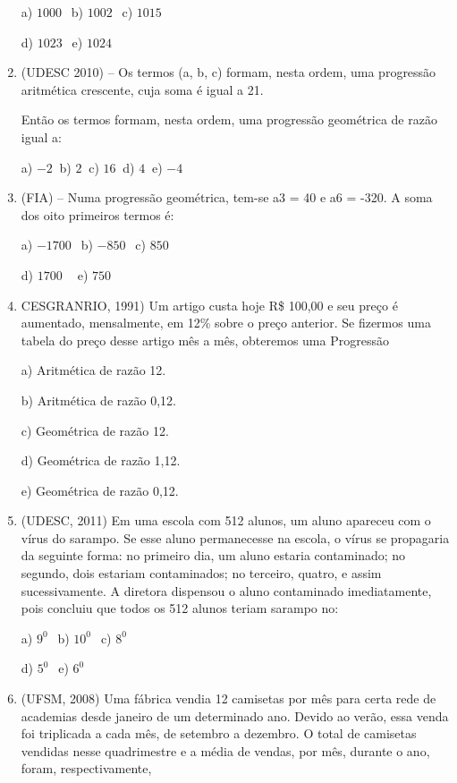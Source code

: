 \begin{multicols*}{2}
\begin{enumerate}
	a) $1000 \ \ $ b) $1002 \ \ $ c) $1015 \ \ $ 
	
	d) $1023 \ \ $ e) $1024 $
	
\item (UDESC 2010) – Os termos (a, b, c) formam, nesta ordem, uma progressão aritmética crescente, cuja soma é igual a 21.

Então os termos formam, nesta ordem, uma progressão geométrica de razão igual a:

	a) $-2 \ $ b) $2 \ $ c) $16 \ $ d) $4 \ $ e) $-4$
	
\item (FIA) – Numa progressão geométrica, tem-se a3 = 40 e a6 = -320. A soma dos oito primeiros termos é:

	a) $-1700 \ \ $ b) $-850 \ \ $ c) $850 \ \ $ 
	
	d) $1700 \ \ \ \ $ e) $750 $

\item CESGRANRIO, 1991) Um artigo custa hoje R\$ 100,00 e seu preço é aumentado, mensalmente, em 12\% sobre o preço anterior. Se fizermos uma tabela do preço desse artigo mês a mês, obteremos uma Progressão

a) Aritmética de razão 12.

b) Aritmética de razão 0,12.

c) Geométrica de razão 12.

d) Geométrica de razão 1,12.

e) Geométrica de razão 0,12.

\item (UDESC, 2011) Em uma escola com 512 alunos, um aluno apareceu com o vírus do sarampo. Se esse aluno permanecesse na escola, o vírus se propagaria da seguinte forma: no primeiro dia, um aluno estaria contaminado; no segundo, dois estariam contaminados; no terceiro, quatro, e assim sucessivamente. A diretora dispensou o aluno contaminado imediatamente, pois concluiu que todos os 512 alunos teriam sarampo no:

	a) $9^0 \ \ $ b) $10^0 \ \ $ c) $8^0 \ \ $ 
	
	d) $5^0 \ \ $ e) $6^0 $

\item (UFSM, 2008) Uma fábrica vendia 12 camisetas por mês para certa rede de academias desde janeiro de um determinado ano. Devido ao verão, essa venda foi triplicada a cada mês, de setembro a dezembro. O total de camisetas vendidas nesse quadrimestre e a média de vendas, por mês, durante o ano, foram, respectivamente,


\end{enumerate}
\end{multicols*}
